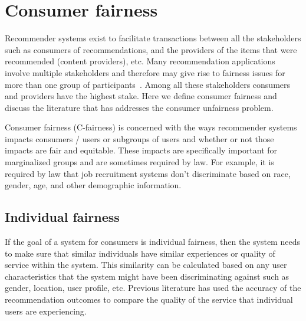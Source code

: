 \section{Consumer fairness}

Recommender systems exist to facilitate transactions between all the stakeholders such as consumers of recommendations, and the providers of the items that were recommended (content providers), etc. Many recommendation applications involve multiple stakeholders and therefore may give rise to fairness issues for more than one group of participants~\cite{burke_multisided_2017}. Among all these stakeholders consumers and providers have the highest stake. 
Here we  define consumer fairness and discuss the literature that has addresses the consumer unfairness problem.

Consumer fairness (C-fairness) is concerned with the ways recommender systems impacts consumers / users or subgroups of users and whether or not those impacts are fair and equitable. These impacts are specifically important for marginalized groups and are sometimes required by law. For example, it is required by law that job recruitment systems don't discriminate based on race, gender, age, and other demographic information. 

    \subsection{Individual fairness}
    If the goal of a system for consumers is individual fairness, then the system needs to make sure that similar individuals have similar experiences or quality of service within the system. This similarity can be calculated based on any user characteristics that the system might have been discriminating against such as gender, location, user profile, etc. Previous literature has used the accuracy of the recommendation outcomes to compare the quality of the service that individual users are experiencing. 
    
